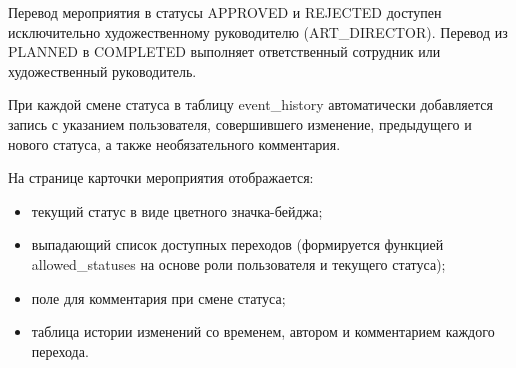 Перевод мероприятия в статусы APPROVED и REJECTED
доступен исключительно художественному руководителю
(ART\_DIRECTOR). Перевод из PLANNED в
COMPLETED выполняет ответственный сотрудник или художественный руководитель.

При каждой смене статуса в таблицу event\_history автоматически
добавляется запись с указанием пользователя, совершившего изменение,
предыдущего и нового статуса, а также необязательного комментария.

На странице карточки мероприятия отображается:
\begin{itemize}
    \item текущий статус в виде цветного значка-бейджа;
    \item выпадающий список доступных переходов (формируется функцией
          allowed\_statuses на основе роли пользователя и
          текущего статуса);
    \item поле для комментария при смене статуса;
    \item таблица истории изменений со временем, автором и
          комментарием каждого перехода.
\end{itemize}